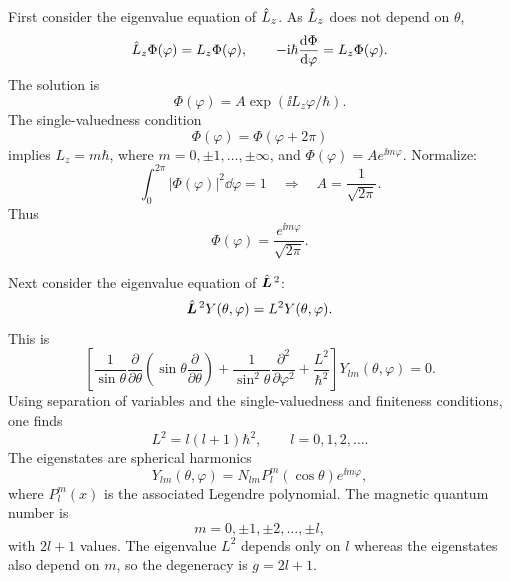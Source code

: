 First consider the eigenvalue equation of $\hat{L}_z$. As $\hat{L}_z$ does not depend on $\theta$,
\begin{equation}
\hat{L}_z\Phi(\varphi)=L_z\Phi(\varphi),\qquad
-\mathrm{i}\hbar\frac{\mathrm{d}\Phi}{\mathrm{d}\varphi}=L_z\Phi(\varphi).
\end{equation}
The solution is
\begin{equation}
\Phi(\varphi)=A\exp(\ii L_z\varphi/\hbar).
\end{equation}
The single-valuedness condition
\begin{equation}
\Phi(\varphi)=\Phi(\varphi+2\pi)
\end{equation}
implies $L_z=m\hbar$, where $m=0,\pm1,\ldots,\pm\infty$, and $\Phi(\varphi)=Ae^{\ii m\varphi}$. Normalize:
\begin{equation}
\int_0^{2\pi}|\Phi(\varphi)|^2\dd\varphi=1
\quad\Longrightarrow\quad A=\frac1{\sqrt{2\pi}}.
\end{equation}
Thus
\begin{equation}
\boxed{\Phi(\varphi)=\frac{e^{\ii m\varphi}}{\sqrt{2\pi}}.}
\end{equation}

Next consider the eigenvalue equation of $\hat{\bm{L}}^{\,2}$:
\begin{equation}
\hat{\bm{L}}^{\,2}Y(\theta,\varphi)=L^2Y(\theta,\varphi).
\end{equation}
This is
\begin{equation}
\left[
\frac1{\sin\theta}\frac\partial{\partial\theta}
\left(\sin\theta\frac\partial{\partial\theta}\right)
+\frac1{\sin^2\theta}\frac{\partial^2}{\partial\varphi^2}
+\frac{L^2}{\hbar^2}\right]Y_{lm}(\theta,\varphi)=0.
\end{equation}
Using separation of variables and the single-valuedness and finiteness conditions, one finds
\begin{equation}
L^2=l(l+1)\hbar^2,\qquad l=0,1,2,\ldots.
\end{equation}
The eigenstates are spherical harmonics
\begin{equation}
Y_{lm}(\theta,\varphi)=N_{lm}P_l^m(\cos\theta)e^{\ii m\varphi},
\end{equation}
where $P_l^m(x)$ is the associated Legendre polynomial. The magnetic quantum number is
\begin{equation}
m=0,\pm1,\pm2,\ldots,\pm l,
\end{equation}
with $2l+1$ values. The eigenvalue $L^2$ depends only on $l$ whereas the eigenstates also depend on $m$, so the degeneracy is $g=2l+1$.

